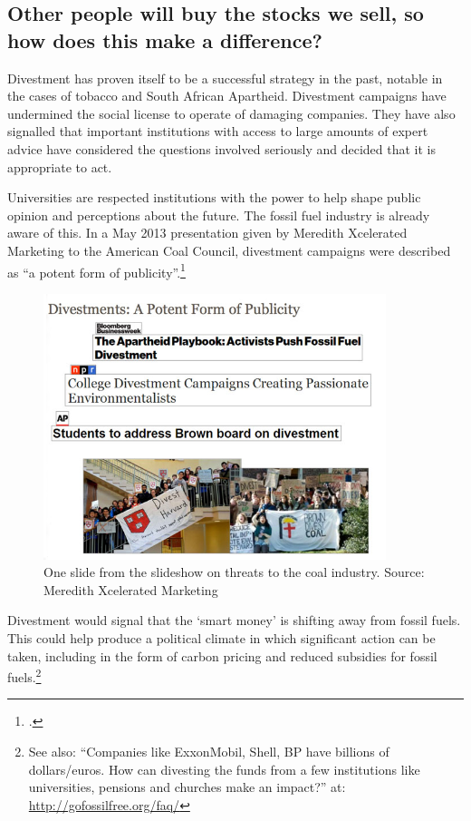 	\subsection{Other people will buy the stocks we sell, so how does this make a difference?}
	\label{OthersWillBuy}
	


Divestment has proven itself to be a successful strategy in the past, notable in the cases of tobacco and South African Apartheid.
Divestment campaigns have undermined the social license to operate of damaging companies.
They have also signalled that important institutions with access to large amounts of expert advice have considered the questions involved seriously and decided that it is appropriate to act.



Universities are respected institutions with the power to help shape public opinion and perceptions about the future.
The fossil fuel industry is already aware of this.
In a May 2013 presentation given by Meredith Xcelerated Marketing to the American Coal Council, divestment campaigns were described as ``a potent form of publicity''.\footcite[][]{PotentPublicity}



\begin{figure}[h]
\includegraphics[width=100mm]{s7-divest-slide.png}
\centering
\caption{One slide from the slideshow on threats to the coal industry. Source: Meredith Xcelerated Marketing}
\label{fig:DivestSlide}
\end{figure}




Divestment would signal that the `smart money' is shifting away from fossil fuels. 
This could help produce a political climate in which significant action can be taken, including in the form of carbon pricing and reduced subsidies for fossil fuels.\footnote{See also: ``Companies like ExxonMobil, Shell, BP have billions of dollars/euros. How can divesting the funds from a few institutions like universities, pensions and churches make an impact?'' at: \url{http://gofossilfree.org/faq/}}


